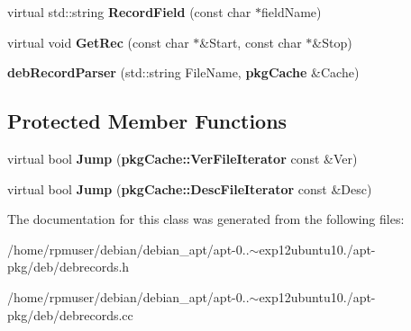 \begin{DoxyCompactItemize}
\item 
virtual std\-::string {\bfseries \-Record\-Field} (const char $\ast$field\-Name)\label{classdebRecordParser_aae48fed9dc5cb814c2383bfe835cd4ba}

\item 
virtual void {\bfseries \-Get\-Rec} (const char $\ast$\&\-Start, const char $\ast$\&\-Stop)\label{classdebRecordParser_a2b57e844101624af8e50274ec51b7724}

\item 
{\bfseries deb\-Record\-Parser} (std\-::string \-File\-Name, {\bf pkg\-Cache} \&\-Cache)\label{classdebRecordParser_a3c085a73fe4f293c1a4f02b047234ccd}

\end{DoxyCompactItemize}
\subsection*{\-Protected \-Member \-Functions}
\begin{DoxyCompactItemize}
\item 
virtual bool {\bfseries \-Jump} ({\bf pkg\-Cache\-::\-Ver\-File\-Iterator} const \&\-Ver)\label{classdebRecordParser_aa4f9da5bb6ff9b716d556530ab0fe3d1}

\item 
virtual bool {\bfseries \-Jump} ({\bf pkg\-Cache\-::\-Desc\-File\-Iterator} const \&\-Desc)\label{classdebRecordParser_a88bc5a72e848c9056495222c609c7806}

\end{DoxyCompactItemize}


\-The documentation for this class was generated from the following files\-:\begin{DoxyCompactItemize}
\item 
/home/rpmuser/debian/debian\-\_\-apt/apt-\/0..$\sim$exp12ubuntu10./apt-\/pkg/deb/debrecords.\-h\item 
/home/rpmuser/debian/debian\-\_\-apt/apt-\/0..$\sim$exp12ubuntu10./apt-\/pkg/deb/debrecords.\-cc\end{DoxyCompactItemize}
